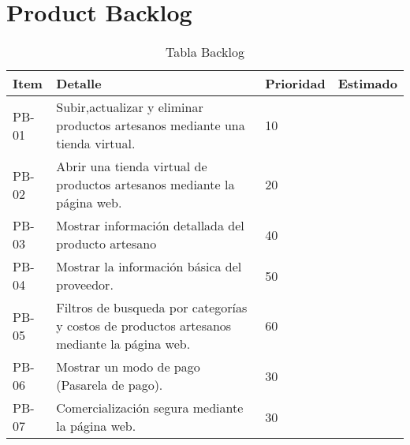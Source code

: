 \chapter{Product Backlog}


\begin{table}[htbp]
	\begin{center}
		\begin{tabular}{|p{2.5cm}|p{6.5cm}|p{2.5cm}|p{2.5cm}|}
			\hline
			Item & Detalle & Prioridad & Estimado\\
			\hline \hline
			PB-01 & Subir,actualizar y eliminar  productos artesanos mediante una tienda virtual. & 10 & \\ \hline
		    PB-02 & Abrir una tienda virtual de productos artesanos mediante la página web. & 20 & \\ \hline
			PB-03 & Mostrar información detallada del producto artesano & 40 & \\ \hline
			PB-04 & Mostrar la información básica del proveedor. & 50 & \\ \hline
			PB-05 & Filtros de busqueda por categorías y costos de productos artesanos mediante la página web. & 60 & \\ \hline
			PB-06 & Mostrar un modo de pago (Pasarela de pago). & 30 & \\ \hline
			PB-07 & Comercialización segura mediante la página web. & 30 & \\ \hline
		\end{tabular}
		\caption{Tabla Backlog}
		\label{tabla:sencilla}
	\end{center}
\end{table}